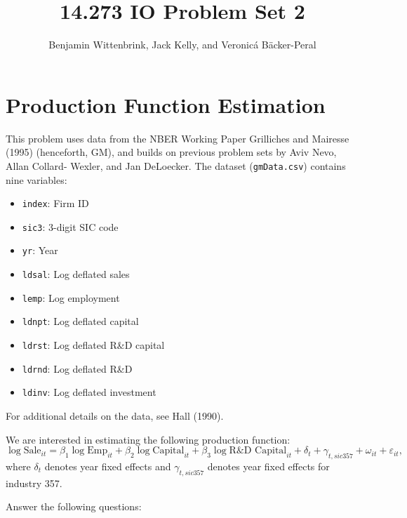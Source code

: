 \documentclass{article}
\title{14.273 IO Problem Set 2}
\author{Benjamin Wittenbrink, Jack Kelly, and Veronicá Bäcker-Peral}
\begin{document}
\maketitle

\section{Production Function Estimation}

This problem uses data from the NBER Working Paper Grilliches and Mairesse (1995) (henceforth, GM), and builds on previous problem sets by Aviv Nevo, Allan Collard-
Wexler, and Jan DeLoecker. The dataset (\texttt{gmData.csv}) contains nine variables: 
\begin{itemize}
\item \texttt{index}: Firm ID
\item \texttt{sic3}: 3-digit SIC code
\item \texttt{yr}: Year
\item \texttt{ldsal}: Log deflated sales
\item \texttt{lemp}: Log employment
\item \texttt{ldnpt}: Log deflated capital 
\item \texttt{ldrst}: Log deflated R\&D capital
\item \texttt{ldrnd}: Log deflated R\&D
\item \texttt{ldinv}: Log deflated investment
\end{itemize}
For additional details on the data, see Hall (1990). 

We are interested in estimating the following production function:
\begin{equation}\label{p1_prod_fn}
\log \text{Sale}_{it} = \beta_1 \log \text{Emp}_{it} + \beta_2 \log \text{Capital}_{it} + \beta_3 \log \text{R\&D Capital}_{it} + \delta_t + \gamma_{t, sic357} + \omega_{it} + \varepsilon_{it},
\end{equation}
where $\delta_t$ denotes year fixed effects and $ \gamma_{t, sic357}$ denotes year fixed effects for industry 357. 

Answer the following questions:
\end{document}

